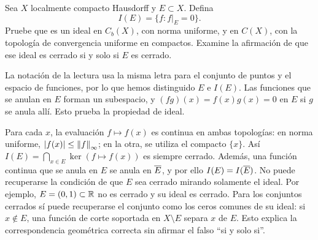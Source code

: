 \begin{ejercicio}\label{ej:v3-l19-6}
Sea $X$ localmente compacto Hausdorff y $E\subset X$. Defina
\[
 I(E)=\{f:f|_E=0\}.
\]
Pruebe que es un ideal en $C_b(X)$, con norma uniforme, y en $C(X)$, con la topología de convergencia uniforme en compactos. Examine la afirmación de que ese ideal es cerrado si y solo si $E$ es cerrado.
\end{ejercicio}
\begin{solucion}
La notación de la lectura usa la misma letra para el conjunto de puntos y el espacio de funciones, por lo que hemos distinguido $E$ e $I(E)$. Las funciones que se anulan en $E$ forman un subespacio, y $(fg)(x)=f(x)g(x)=0$ en $E$ si $g$ se anula allí. Esto prueba la propiedad de ideal.

Para cada $x$, la evaluación $f\mapsto f(x)$ es continua en ambas topologías: en norma uniforme, $|f(x)|\leq\left\lVert f\right\rVert_\infty$; en la otra, se utiliza el compacto $\{x\}$. Así
$I(E)=\bigcap_{x\in E}\ker(f\mapsto f(x))$ es siempre cerrado. Además, una función continua que se anula en $E$ se anula en $\overline{E}$, y por ello $I(E)=I(\overline{E})$. No puede recuperarse la condición de que $E$ sea cerrado mirando solamente el ideal. Por ejemplo, $E=(0,1)\subset\mathbb R$ no es cerrado y su ideal es cerrado. Para los conjuntos cerrados sí puede recuperarse el conjunto como los ceros comunes de su ideal: si $x\notin E$, una función de corte soportada en $X\setminus E$ separa $x$ de $E$. Esto explica la correspondencia geométrica correcta sin afirmar el falso ``si y solo si''.
\end{solucion}

